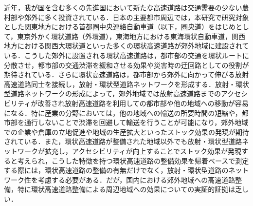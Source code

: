 近年，我が国を含む多くの先進国において新たな高速道路は交通需要の少ない農村部や郊外に多く投資されている．日本の主要都市周辺では，本研究で研究対象とした関東地方における首都圏中央連絡自動車道（以下，圏央道）をはじめとして，東京外かく環状道路（外環道），東海地方における東海環状自動車道，関西地方における関西大環状道といった多くの環状高速道路が郊外地域に建設されている．こうした郊外に設置される環状高速道路は，都市部の交通を環状ルートに分散させ，都市部の交通渋滞を緩和させる効果や災害時の迂回路としての役割が期待されている．さらに環状高速道路は，都市部から郊外に向かって伸びる放射高速道路同士を接続し，放射・環状型道路ネットワークを形成する．放射・環状型道路ネットワークの形成によって，郊外地域では放射高速道路までのアクセシビリティが改善され放射高速道路を利用しての都市部や他の地域への移動が容易になる．特に産業の分野においては，他の地域への輸送の所要時間の短縮や，都市部を通行しないことで渋滞を回避して輸送を行うことが可能になり，郊外地域での企業や倉庫の立地促進や地域の生産拡大といったストック効果の発現が期待されている．また，環状高速道路が整備された地域以外でも放射・環状型道路ネットワークが拡充し，アクセシビリティが向上することでストック効果が発現すると考えられ，こうした特徴を持つ環状高速道路の整備効果を帰着ベースで測定する際には，環状高速道路の整備の有無だけでなく，放射・環状型道路のネットワーク性を考慮する必要がある．だが，国内における郊外地域への高速道路整備，特に環状高速道路整備による周辺地域への効果についての実証的証拠は乏しい．
